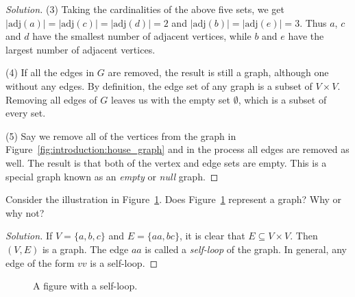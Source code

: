 \begin{proof}[Solution]
(3) Taking the cardinalities of the above five sets, we get
$|\text{adj}(a)| = |\text{adj}(c)| = |\text{adj}(d)| = 2$ and
$|\text{adj}(b)| = |\text{adj}(e)| = 3$. Thus $a$, $c$ and $d$ have
the smallest number of adjacent vertices, while $b$ and $e$ have the
largest number of adjacent vertices.

(4) If all the edges in $G$ are removed, the result is still a graph,
although one without any edges. By definition, the edge set of any
graph is a subset of $V \times V$. Removing all edges of $G$ leaves us
with the empty set $\emptyset$, which is a subset of every set.

(5) Say we remove all of the vertices from the graph in
Figure~\ref{fig:introduction:house_graph} and in the process all edges
are removed as well. The result is that both of the vertex and edge
sets are empty. This is a special graph known as an \emph{empty} or
\emph{null} graph.
\end{proof}

\begin{example}
Consider the illustration in
Figure~\ref{fig:introduction:self_loop}. Does
Figure~\ref{fig:introduction:self_loop} represent a graph? Why or why not?
\end{example}

\begin{proof}[Solution]
If $V = \{ a, b, c \}$ and $E = \{ aa, bc \}$, it is clear that $E
\subseteq V \times V$. Then $(V, E)$ is a graph. The edge $aa$ is
called a \emph{self-loop} of the graph. In general, any edge of the
form $vv$ is a self-loop.
\end{proof}

\begin{figure}[!htbp]
\centering
{}
\caption{A figure with a self-loop.}
\label{fig:introduction:self_loop}
\end{figure}

